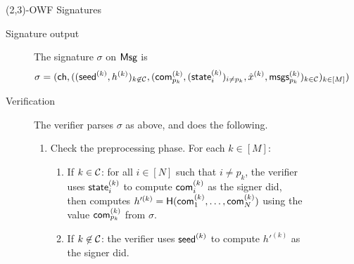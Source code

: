 \begin{figure}[p]
\begin{minipage}[t]{1.1\textwidth}
\begin{protocolbox}{(2,3)-OWF Signatures}
\begin{description}
    \item[Signature output]
The signature $\sigma$ on $\textsf{Msg}$ is 
\[
\sigma = (\textsf{ch}, 
          ((\textsf{seed}^{(k)}, h^{(k)} )_{k\not\in\mathcal{C}}, 
          ( \textsf{com}^{(k)}_{p_k}, (\textsf{state}^{(k)}_{i})_{i\neq p_k}, \hat{x}^{(k)}, \textsf{msgs}_{p_k}^{(k)} )_{k\in\mathcal{C}})_{k\in[M]})
\]
    
    \item[Verification] The verifier parses $\sigma$ as above, and does the following.  
    \begin{enumerate}
        \item Check the preprocessing phase. For each $k\in[M]$:
        \begin{enumerate}
        \item If $k \in \mathcal{C}$: for all $i\in[N]$  such that $i \neq p_k$, the verifier uses $\textsf{state}^{(k)}_{i}$ to compute $\textsf{com}^{(k)}_{i}$ as 
            the signer did, then computes $h'^{(k)} = \textsf{H}(\textsf{com}^{(k)}_{1},\ldots,\textsf{com}^{(k)}_{N})$ using 
            the value $\textsf{com}^{(k)}_{p_k}$ from $\sigma$. 
        \item If $k\not\in\mathcal{C}$: the verifier uses $\textsf{seed}^{(k)}$ to compute $h'^{(k)}$ as the signer did.
        \end{enumerate} 
        

\end{enumerate}
\end{description}
\end{protocolbox}
\end{minipage}
\end{figure}
